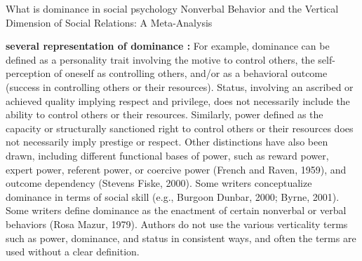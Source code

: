 What is dominance in social psychology
Nonverbal Behavior and the Vertical Dimension of Social Relations: A Meta-Analysis

\textbf{several representation of dominance :} 
For example, dominance can be defined as a personality trait involving the motive to control others, the self-
perception of oneself as controlling others, and/or as a behavioral
outcome (success in controlling others or their resources). Status,
involving an ascribed or achieved quality implying respect and
privilege, does not necessarily include the ability to control others
or their resources. Similarly, power defined as the capacity or
structurally sanctioned right to control others or their resources
does not necessarily imply prestige or respect. Other distinctions
have also been drawn, including different functional bases of
power, such as reward power, expert power, referent power, or
coercive power (French and Raven, 1959), and outcome dependency
(Stevens  Fiske, 2000). Some writers conceptualize dominance
in terms of social skill (e.g., Burgoon  Dunbar, 2000; Byrne,
2001). Some writers define dominance as the enactment of certain
nonverbal or verbal behaviors (Rosa  Mazur, 1979). Authors do
not use the various verticality terms such as power, dominance,
and status in consistent ways, and often the terms are used without
a clear definition.